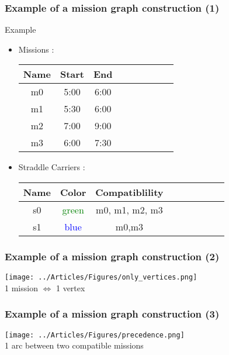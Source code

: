 \documentclass{beamer}
\begin{document}
\begin{frame}
 \frametitle{Example of a mission graph construction (1)}
	\begin{exampleblock}{Example}
		\begin{itemize}
		 \item Missions : \\
		\begin{center}
			\begin{tabular}{*{3}{|c|c|c}}
	 	 		\hline
		 		Name	&	Start	&	End\\
				\hline
				m0	&	5:00	&	6:00 \\
				m1	&	5:30	&	6:00 \\
				m2	&	7:00	&	9:00 \\
				m3	&	6:00	&	7:30 \\
				\hline
	 		\end{tabular}
		\end{center}
		\item Straddle Carriers : \\
		\begin{center}
			\begin{tabular}{*{3}{|c|c|c}}
	 	 		\hline
		 		Name	&	Color	& Compatiblility\\
				\hline
				s0	&	\textcolor{green}{green}	& m0, m1, m2, m3\\
				s1	&	\textcolor{blue}{blue}	& m0,m3\\	
				\hline
	 		\end{tabular}
		\end{center}
		
		\end{itemize}

	\end{exampleblock}
	

	
\end{frame}
\begin{frame}
	\frametitle{Example of a mission graph construction (2)}
	\begin{center}
		\texttt{[image: ../Articles/Figures/only\_vertices.png]} \\
	
		1 mission $\Longleftrightarrow$ 1 vertex
	\end{center}
	
\end{frame}
\begin{frame}
	\frametitle{Example of a mission graph construction (3)}
 	\begin{center}
 		\texttt{[image: ../Articles/Figures/precedence.png]} \\

		1 arc between two compatible missions
	\end{center}
\end{frame}
\end{document}
